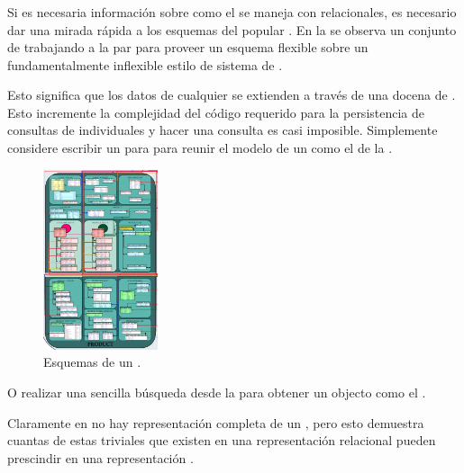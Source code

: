\subsubsection{\catalogManagementCOM}

Si es necesaria información sobre como el \catalogManagementCOM se maneja con \dataBasesDB relacionales, es necesario dar una mirada rápida a los esquemas del popular \nameMagento \ecommerce \frameworkPC {}. En la  se observa un conjunto de \tablesDB trabajando a la par para proveer un esquema flexible sobre un fundamentalmente inflexible estilo de sistema de \dataBaseDB.

Esto significa que los datos de cualquier \itemCOM se extienden a través de una docena de \tablesDB. Esto incremente la complejidad del código requerido para la persistencia de consultas de \itemsCOM individuales y hacer una consulta \shellBased es casi imposible. Simplemente considere escribir un \sqlNAME \join para para reunir el modelo de un \itemCOM como el de la .

\begin{figure}[h!]
	\centering
	\includegraphics[width=0.3\textwidth]{figuras/cap2/magento_product_schema.png}
	\caption{Esquemas de un \itemCOM.}
	\label{cap:figure:catalog_magento}
\end{figure}

O realizar una sencilla búsqueda desde la \shell \mongodbNAME \javaScriptNAME  para obtener un objecto \jsonNAME como el .

Claramente en  no hay representación completa de un \itemCOM, pero esto demuestra cuantas de estas \tablesDB triviales que existen en una representación relacional pueden prescindir en una representación \documentDB.

